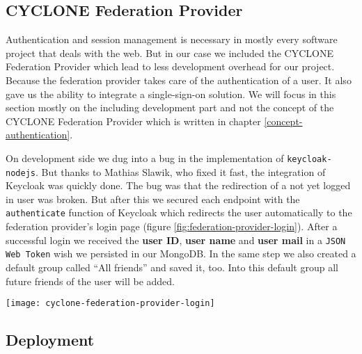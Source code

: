 \subsection{CYCLONE Federation Provider}
\label{federation-provider}

Authentication and session management is necessary in mostly every software project that deals with the web. But in our case we included the CYCLONE Federation Provider which lead to less development overhead for our project. Because the federation provider takes care of the authentication of a user. It also gave us the ability to integrate a single-sign-on solution. We will focus in this section mostly on the including development part and not the concept of the CYCLONE Federation Provider which is written in chapter \ref{concept-authentication}.

On development side we dug into a bug in the implementation of \texttt{keycloak-nodejs}. But thanks to Mathias Slawik, who fixed it fast, the integration of Keycloak was quickly done. The bug was that the redirection of a not yet logged in user was broken. But after this we secured each endpoint with the \texttt{authenticate} function of Keycloak which redirects the user automatically to the federation provider's login page (figure \ref{fig:federation-provider-login}). After a successful login we received the \textbf{user ID}, \textbf{user name} and \textbf{user mail} in a \texttt{JSON Web Token} wish we persisted in our MongoDB. In the same step we also created a default group called \enquote{All friends} and saved it, too. Into this default group all future friends of the user will be added.

\begin{center}
    \texttt{[image: cyclone-federation-provider-login]}\\
    \label{fig:federation-provider-login}
\end{center}

\subsection{Deployment}

